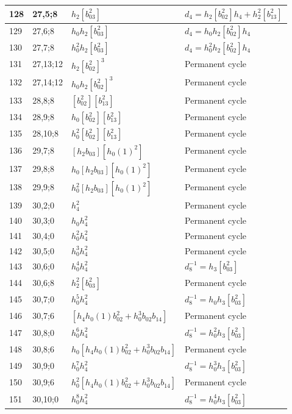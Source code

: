 \documentclass{article}
\begin{document}
\begin{longtable}{|l|l|>{\raggedright\arraybackslash}p{6cm}|>{\raggedright\arraybackslash}p{6cm}|}
\hline
128 & 27,5;8 & $h_2[b_{03}^2]$ &$d_{4}=h_2[b_{02}^2]h_4 + h_2^2[b_{13}^2]$\\
\hline
129 & 27,6;8 & $h_0h_2[b_{03}^2]$ &$d_{4}=h_0h_2[b_{02}^2]h_4$\\
\hline
130 & 27,7;8 & $h_0^2h_2[b_{03}^2]$ &$d_{4}=h_0^2h_2[b_{02}^2]h_4$\\
\hline
131 & 27,13;12 & $h_2[b_{02}^2]^3$ & Permanent cycle\\
\hline
132 & 27,14;12 & $h_0h_2[b_{02}^2]^3$ & Permanent cycle\\
\hline
133 & 28,8;8 & $[b_{02}^2][b_{13}^2]$ & Permanent cycle\\
\hline
134 & 28,9;8 & $h_0[b_{02}^2][b_{13}^2]$ & Permanent cycle\\
\hline
135 & 28,10;8 & $h_0^2[b_{02}^2][b_{13}^2]$ & Permanent cycle\\
\hline
136 & 29,7;8 & $[h_2b_{03}][h_0(1)^2]$ & Permanent cycle\\
\hline
137 & 29,8;8 & $h_0[h_2b_{03}][h_0(1)^2]$ & Permanent cycle\\
\hline
138 & 29,9;8 & $h_0^2[h_2b_{03}][h_0(1)^2]$ & Permanent cycle\\
\hline
139 & 30,2;0 & $h_4^2$ & Permanent cycle\\
\hline
140 & 30,3;0 & $h_0h_4^2$ & Permanent cycle\\
\hline
141 & 30,4;0 & $h_0^2h_4^2$ & Permanent cycle\\
\hline
142 & 30,5;0 & $h_0^3h_4^2$ & Permanent cycle\\
\hline
143 & 30,6;0 & $h_0^4h_4^2$ & $d_{8}^{-1}=h_3[b_{03}^2]$\\
\hline
144 & 30,6;8 & $h_2^2[b_{03}^2]$ & Permanent cycle\\
\hline
145 & 30,7;0 & $h_0^5h_4^2$ & $d_{8}^{-1}=h_0h_3[b_{03}^2]$\\
\hline
146 & 30,7;6 & $[h_4h_0(1)b_{02}^2 + h_0^3b_{02}b_{14}]$ & Permanent cycle\\
\hline
147 & 30,8;0 & $h_0^6h_4^2$ & $d_{8}^{-1}=h_0^2h_3[b_{03}^2]$\\
\hline
148 & 30,8;6 & $h_0[h_4h_0(1)b_{02}^2 + h_0^3b_{02}b_{14}]$ & Permanent cycle\\
\hline
149 & 30,9;0 & $h_0^7h_4^2$ & $d_{8}^{-1}=h_0^3h_3[b_{03}^2]$\\
\hline
150 & 30,9;6 & $h_0^2[h_4h_0(1)b_{02}^2 + h_0^3b_{02}b_{14}]$ & Permanent cycle\\
\hline
151 & 30,10;0 & $h_0^8h_4^2$ & $d_{8}^{-1}=h_0^4h_3[b_{03}^2]$\\

\end{longtable}
\end{document}

